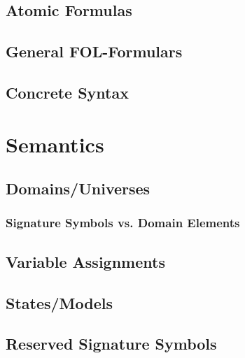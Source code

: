 \documentclass[a4paper, 11pt, accentcolor = tud3b]{tudreport}
\begin{document}
            \subsection{Atomic Formulas} %

            \subsection{General FOL-Formulars} %

            \subsection{Concrete Syntax} %

        \section{Semantics} %

            \subsection{Domains/Universes} %

                \subsubsection{Signature Symbols vs. Domain Elements} %

            \subsection{Variable Assignments} %

            \subsection{States/Models} %

            \subsection{Reserved Signature Symbols} %
\end{document}
